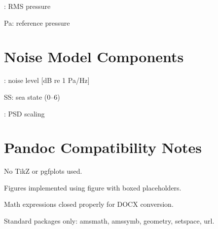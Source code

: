 \documentclass[12pt]{article}
\begin{document}
: RMS pressure

Pa: reference pressure

\section*{Noise Model Components}
: noise level [dB re 1 Pa/Hz]

SS: sea state (0–6)

: PSD scaling

\section*{Pandoc Compatibility Notes}
No TikZ or pgfplots used.

Figures implemented using figure with boxed placeholders.

Math expressions closed properly for DOCX conversion.

Standard packages only: amsmath, amssymb, geometry, setspace, url.
\end{document}
